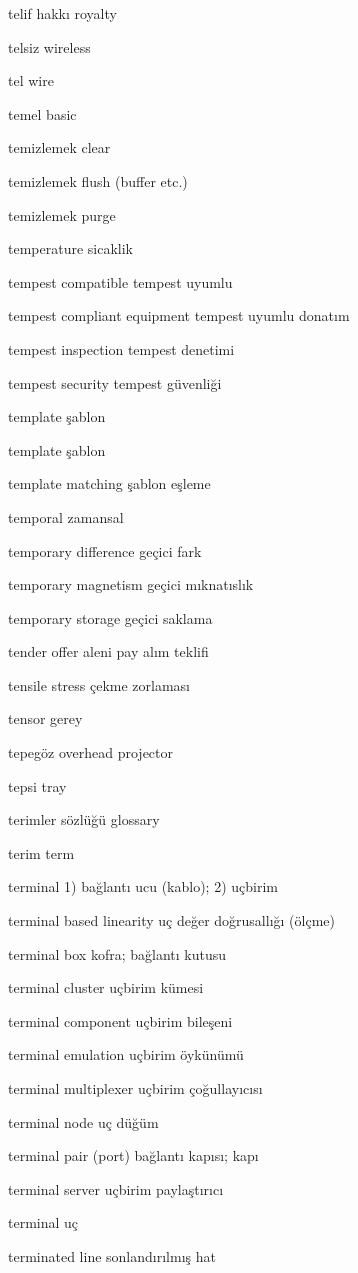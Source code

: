 \documentclass[12pt,fleqn]{article}\usepackage{../../common}
\begin{document}
telif hakkı royalty

telsiz wireless

tel wire

temel basic

temizlemek clear

temizlemek flush (buffer etc.)

temizlemek purge

temperature sicaklik

tempest compatible tempest uyumlu

tempest compliant equipment tempest uyumlu donatım

tempest inspection tempest denetimi

tempest security tempest güvenliği

template şablon

template şablon

template matching şablon eşleme

temporal zamansal

temporary difference geçici fark

temporary magnetism geçici mıknatıslık

temporary storage geçici saklama

tender offer aleni pay alım teklifi

tensile stress çekme zorlaması

tensor gerey

tepegöz overhead projector

tepsi tray

terimler sözlüğü glossary

terim term

terminal 1) bağlantı ucu (kablo); 2) uçbirim

terminal based linearity uç değer doğrusallığı (ölçme)

terminal box kofra; bağlantı kutusu

terminal cluster uçbirim kümesi

terminal component uçbirim bileşeni

terminal emulation uçbirim öykünümü

terminal multiplexer uçbirim çoğullayıcısı

terminal node uç düğüm

terminal pair (port) bağlantı kapısı; kapı

terminal server uçbirim paylaştırıcı

terminal uç

terminated line sonlandırılmış hat
\end{document}

